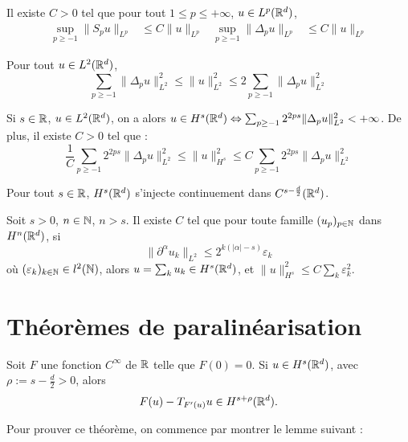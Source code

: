 \documentclass[11pt,a4paper]{article}
\begin{document}
\begin{lemma}\label{young}
Il existe $C>0$ tel que pour tout $1\leq p \leq +\infty$, $u \in L^p(\mathbb R^d)$, 
\begin{align*}
\sup_{p\geq -1}\|S_pu\|_{L^p} &\leq C \|u\|_{L^p} & \sup_{p\geq -1}\|\Delta_pu\|_{L^p} &\leq C \|u\|_{L^p}
\end{align*}
\end{lemma}


\begin{lemma}
Pour tout $u\in L^2(\mathbb R^d)$, 
\begin{equation}\label{qortho}
\sum_{p \geq -1} \|\Delta_p u \|^2_{L^2} \leq \| u \|^2_{L^2} \leq 2 \sum_{p \geq -1} \|\Delta_p u \|^2_{L^2} 
\end{equation}
\end{lemma}


\begin{thm}
Si $s\in \mathbb R$, $u\in L^2(\mathbb R^d)$, on a alors $u\in H^s(\mathbb R^d) \Leftrightarrow \sum_{p\geq -1}2^{2ps}\|\Delta_p u \|_{L^2}^2 < +\infty$. De plus, il existe $C>0$ tel que :
\begin{equation}\label{carac_sobol}
\frac{1}{C}\sum_{p\geq -1}2^{2ps}\|\Delta_p u \|_{L^2}^2 \leq \|u\|_{H^s}^2 \leq C \sum_{p\geq -1}2^{2ps}\|\Delta_p u \|_{L^2}^2 
\end{equation}
\end{thm}

\begin{thm}\label{inject}
Pour tout $s\in \mathbb R$, $H^s(\mathbb R^d)$ s'injecte continuement dans $C^{s-\frac{d}{2}}(\mathbb R^d)$.
\end{thm}


\begin{thm}[]\label{meyer}
Soit $s>0$, $n\in \mathbb N$, $n>s$. Il existe $C$ tel que pour toute famille $(u_p)_{p\in \mathbb N}$ dans $H^n(\mathbb R^d)$, si
\begin{equation*}
\| \partial ^\alpha u_k \|_{L^2} \leq 2^{k(|\alpha|-s)}\varepsilon_k
\end{equation*}
où $(\varepsilon_k)_{k\in \mathbb N} \in l^2(\mathbb N)$, alors $u=\sum_k u_k \in H^s(\mathbb R^d) $, et $ \|u\|_{H^s}^2 \leq C \sum_k \varepsilon_k^2 $.
\end{thm}


\section{Théorèmes de paralinéarisation}

\begin{thm}\label{paralin}
Soit $F$ une fonction $C^{\infty}$ de $\mathbb R$ telle que $F(0)=0$. Si $u\in H^s(\mathbb R^d)$, avec $\rho := s - \frac{d}{2}>0 $, alors 
\begin{equation}
F(u) - T_{F'(u)}u \in H^{s+\rho}(\mathbb R^d).
\end{equation}
\end{thm}
Pour prouver ce théorème, on commence par montrer le lemme suivant : 
\end{document}
